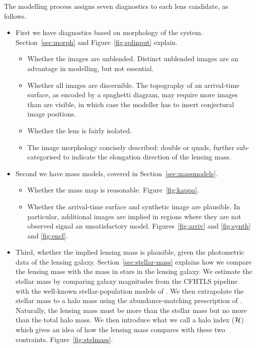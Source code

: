 The modelling process assigns seven diagnostics to each lens
candidate, as follows.

\begin{itemize}
\item First we have diagnostics based on morphology of the
  system.
  Section~\ref{sec:morph} and Figure~\ref{fig:splinput} explain.
\begin{itemize}
\item Whether the images are unblended.  Distinct unblended images are
  an advantage in modelling, but not essential.
\item Whether all images are discernible.  The topography of an
  arrival-time surface, as encoded by a spaghetti diagram, may require
  more images than are visible, in which case the modeller has to
  insert conjectural image positions.
\item Whether the lens is fairly isolated.
\item The image morphology concisely described: double or quads,
  further sub-categorised to indicate the elongation direction of the
  lensing mass.
\end{itemize}
\item Second we have mass models, covered in Section~\ref{sec:massmodels}.
\begin{itemize}
\item Whether the mass map is reasonable. Figure~\ref{fig:kappa}.
\item Whether the arrival-time surface and synthetic image are
  plausible.  In particular, additional images are implied in regions
  where they are not observed signal an unsatisfactory model.
  Figures~\ref{fig:arriv} and \ref{fig:synth} and \ref{fig:encl}.
\end{itemize}
\item Third, whether the implied lensing mass is plausible, given the
  photometric data of the lensing galaxy.  Section~\ref{sec:stellar-mass}
  explains how we compare the lensing mass with the mass in stars in
  the lensing galaxy.  We estimate the stellar mass by comparing
  galaxy magnitudes from the CFHTLS pipeline with the well-known
  stellar-population models of \cite{2003MNRAS.344.1000B}.  We then
  extrapolate the stellar mass to a halo mass using the
  abundance-matching prescription of \cite{2010ApJ...710..903M}.
  Naturally, the lensing mass must be more than the stellar mass but
  no more than the total halo mass.  We then introduce what we call a
  halo index ($\mathcal{H}$) which gives an idea of how the lensing mass
  compares with these two contraints.  Figure~\ref{fig:stelmass}.
\end{itemize}

